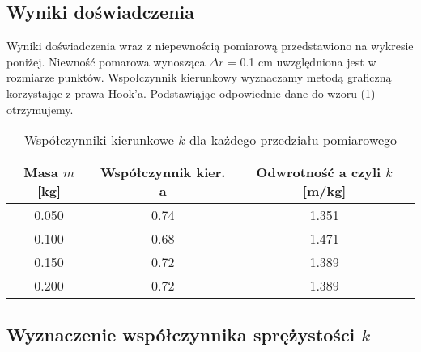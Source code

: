 \documentclass{article} %
\begin{document}
\subsection{Wyniki doświadczenia}
Wyniki doświadczenia wraz z niepewnością pomiarową przedstawiono na wykresie poniżej. Niewność pomarowa wynosząca $\Delta r$ = 0.1 cm uwzględniona jest w rozmiarze punktów. Wspołczynnik kierunkowy wyznaczamy metodą graficzną korzystając z prawa Hook'a. Podstawiąjąc odpowiednie dane do wzoru (1) otrzymujemy.
{
\begin{center}



\begin{table}[h!]
\centering

\label{tab:coefficients}

\begin{tabular}{|c|c|c|}
\hline
\textbf{Masa \( m \) [kg]} & \textbf{Współczynnik kier. a} & \textbf{Odwrotność a czyli \( k \) [m/kg]} \\ 
\hline
0.050 & 0.74 & 1.351 \\ 
0.100 & 0.68 & 1.471 \\ 
0.150 & 0.72 & 1.389 \\ 
0.200 & 0.72 & 1.389 \\
\hline
\end{tabular}
\caption{Współczynniki kierunkowe \( k \) dla każdego przedziału pomiarowego}
\end{table}
\end{center}
}
\subsection{Wyznaczenie współczynnika sprężystości $k$}
\end{document}
